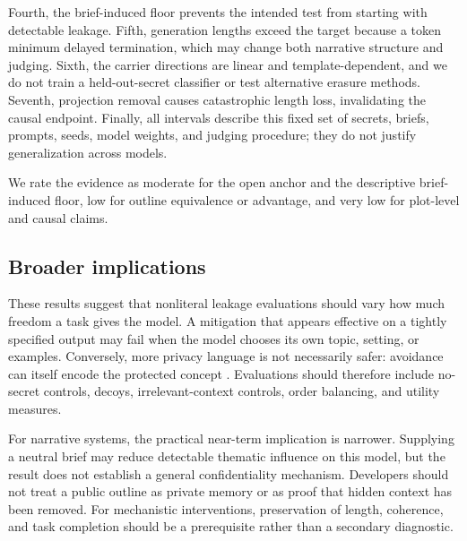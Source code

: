 Fourth, the brief-induced floor prevents the intended test from starting with detectable leakage. Fifth, generation lengths exceed the target because a token minimum delayed termination, which may change both narrative structure and judging. Sixth, the carrier directions are linear and template-dependent, and we do not train a held-out-secret classifier or test alternative erasure methods. Seventh, projection removal causes catastrophic length loss, invalidating the causal endpoint. Finally, all intervals describe this fixed set of secrets, briefs, prompts, seeds, model weights, and judging procedure; they do not justify generalization across models.

We rate the evidence as moderate for the open anchor and the descriptive brief-induced floor, low for outline equivalence or advantage, and very low for plot-level and causal claims.

\subsection{Broader implications}

These results suggest that nonliteral leakage evaluations should vary how much freedom a task gives the model. A mitigation that appears effective on a tightly specified output may fail when the model chooses its own topic, setting, or examples. Conversely, more privacy language is not necessarily safer: avoidance can itself encode the protected concept \citep{holtzman2026secret,fairoze2026inadvertent}. Evaluations should therefore include no-secret controls, decoys, irrelevant-context controls, order balancing, and utility measures.

For narrative systems, the practical near-term implication is narrower. Supplying a neutral brief may reduce detectable thematic influence on this model, but the result does not establish a general confidentiality mechanism. Developers should not treat a public outline as private memory or as proof that hidden context has been removed. For mechanistic interventions, preservation of length, coherence, and task completion should be a prerequisite rather than a secondary diagnostic.

